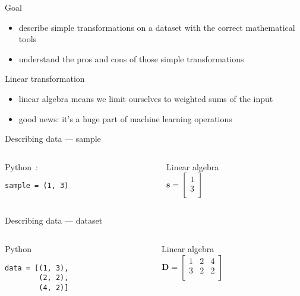\begin{frame}{Goal}

  \begin{itemize}[<+->]
  \item describe simple transformations on a dataset with the correct mathematical tools
  \item understand the pros and cons of those simple transformations
  \end{itemize}
\end{frame}

\begin{frame}{Linear transformation}

  \begin{itemize}
  \item linear algebra means we limit ourselves to weighted sums of the input
  \item good news: it's a huge part of machine learning operations
  \end{itemize}
\end{frame}

\begin{frame}[fragile]{Describing data — sample}
  \begin{columns}
    \begin{column}{0.5\textwidth}
      Python :
      \begin{verbatim}
sample = (1, 3)
      \end{verbatim}
    \end{column}
    \begin{column}{0.5\textwidth}
      Linear algebra \\[.3cm]

      \( \mathbf{s} = \begin{bmatrix}
        1 \\
        3 \\
      \end{bmatrix}
      \)
    \end{column}
  \end{columns}
\end{frame}

\begin{frame}[fragile]{Describing data — dataset}
  \begin{columns}
    \begin{column}{0.5\textwidth}
      Python
      \begin{verbatim}
data = [(1, 3),
        (2, 2),
        (4, 2)]
      \end{verbatim}
    \end{column}
    \begin{column}{0.5\textwidth}
      Linear algebra\\[.3cm]

      \(
      \mathbf{D} = \begin{bmatrix}
        1 & 2 & 4 \\
        3 & 2 & 2 \\
      \end{bmatrix}
      \)
    \end{column}
  \end{columns}
\end{frame}

